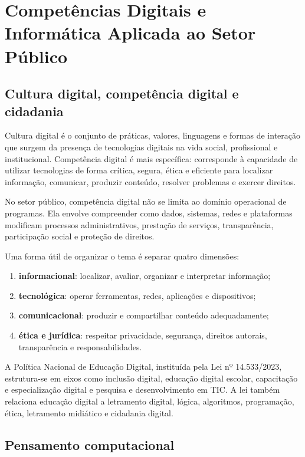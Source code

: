 \chapter{Competências Digitais e Informática Aplicada ao Setor Público}

\section{Cultura digital, competência digital e cidadania}

Cultura digital é o conjunto de práticas, valores, linguagens e formas de interação que surgem da presença de tecnologias digitais na vida social, profissional e institucional. Competência digital é mais específica: corresponde à capacidade de utilizar tecnologias de forma crítica, segura, ética e eficiente para localizar informação, comunicar, produzir conteúdo, resolver problemas e exercer direitos.

No setor público, competência digital não se limita ao domínio operacional de programas. Ela envolve compreender como dados, sistemas, redes e plataformas modificam processos administrativos, prestação de serviços, transparência, participação social e proteção de direitos.

\begin{teoria}
Uma forma útil de organizar o tema é separar quatro dimensões:
\begin{enumerate}
\item \textbf{informacional}: localizar, avaliar, organizar e interpretar informação;
\item \textbf{tecnológica}: operar ferramentas, redes, aplicações e dispositivos;
\item \textbf{comunicacional}: produzir e compartilhar conteúdo adequadamente;
\item \textbf{ética e jurídica}: respeitar privacidade, segurança, direitos autorais, transparência e responsabilidades.
\end{enumerate}
\end{teoria}

A Política Nacional de Educação Digital, instituída pela Lei nº 14.533/2023, estrutura-se em eixos como inclusão digital, educação digital escolar, capacitação e especialização digital e pesquisa e desenvolvimento em TIC. A lei também relaciona educação digital a letramento digital, lógica, algoritmos, programação, ética, letramento midiático e cidadania digital.

\section{Pensamento computacional}

